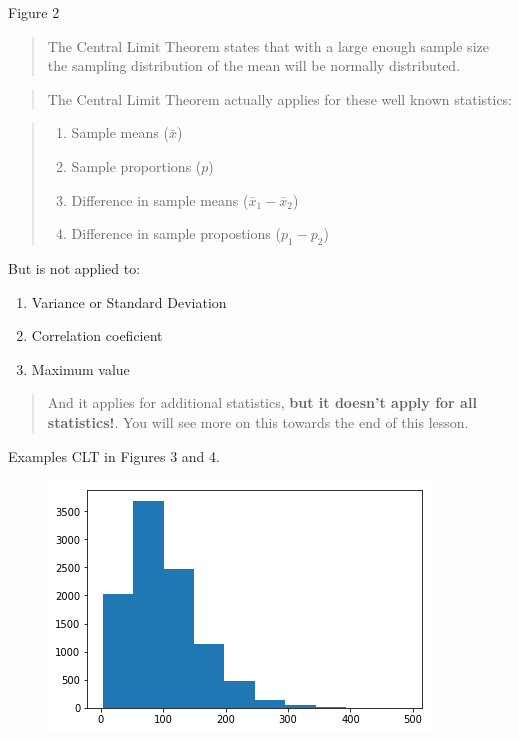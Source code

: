 \documentclass[]{book}
\providecommand{\tightlist}{%
  \setlength{\itemsep}{0pt}\setlength{\parskip}{0pt}}
\begin{document}
Figure 2

\begin{quote}
The Central Limit Theorem states that with a large enough sample size
the sampling distribution of the mean will be normally distributed.
\end{quote}

\begin{quote}
The Central Limit Theorem actually applies for these well known
statistics:
\end{quote}

\begin{quote}
\begin{enumerate}
\def\labelenumi{\arabic{enumi}.}
\tightlist
\item
  Sample means (\(\bar x\))
\item
  Sample proportions (\(p\))
\item
  Difference in sample means (\(\bar x_1 - \bar x_2\))
\item
  Difference in sample propostions (\(p_1 - p_2\))
\end{enumerate}
\end{quote}

But is not applied to:

\begin{enumerate}
\def\labelenumi{\arabic{enumi}.}
\tightlist
\item
  Variance or Standard Deviation
\item
  Correlation coeficient
\item
  Maximum value
\end{enumerate}

\begin{quote}
And it applies for additional statistics, \textbf{but it doesn't apply
for all statistics!}. You will see more on this towards the end of this
lesson.
\end{quote}

Examples CLT in Figures 3 and 4.

\begin{figure}
\centering
\includegraphics{01-img/c4_l10_03.png}
\caption{}
\end{figure}
\end{document}
